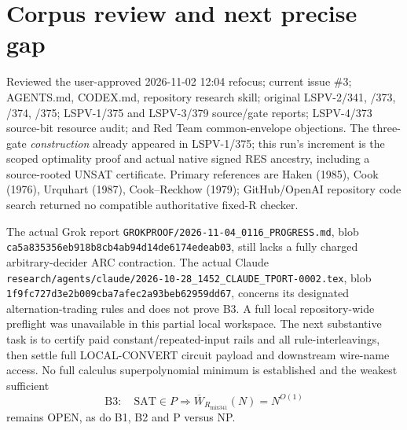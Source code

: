 \documentclass[11pt]{article}
\begin{document}
\section*{Corpus review and next precise gap}
Reviewed the user-approved 2026-11-02 12:04 refocus; current issue \#3; AGENTS.md, CODEX.md, repository research skill; original LSPV-2/341, /373, /374, /375; LSPV-1/375 and LSPV-3/379 source/gate reports; LSPV-4/373 source-bit resource audit; and Red Team common-envelope objections. The three-gate \emph{construction} already appeared in LSPV-1/375; this run's increment is the scoped optimality proof and actual native signed RES ancestry, including a source-rooted UNSAT certificate. Primary references are Haken (1985), Cook (1976), Urquhart (1987), Cook--Reckhow (1979); GitHub/OpenAI repository code search returned no compatible authoritative fixed-R checker.

The actual Grok report \texttt{GROKPROOF/2026-11-04\_0116\_PROGRESS.md}, blob \texttt{ca5a835356eb918b8cb4ab94d14de6174edeab03}, still lacks a fully charged arbitrary-decider ARC contraction. The actual Claude \texttt{research/agents/claude/2026-10-28\_1452\_CLAUDE\_TPORT-0002.tex}, blob \texttt{1f9fc727d3e2b009cba7afec2a93beb62959dd67}, concerns its designated alternation-trading rules and does not prove B3. A full local repository-wide preflight was unavailable in this partial local workspace. The next substantive task is to certify paid constant/repeated-input rails and all rule-interleavings, then settle full LOCAL-CONVERT circuit payload and downstream wire-name access. No full calculus superpolynomial minimum is established and the weakest sufficient
\[
\mathrm{B3}:\quad\mathrm{SAT}\in P\Longrightarrow \overline W_{R_{\mathrm{mix341}}}(N)=N^{O(1)}
\]
remains OPEN, as do B1, B2 and P versus NP.
\end{document}
